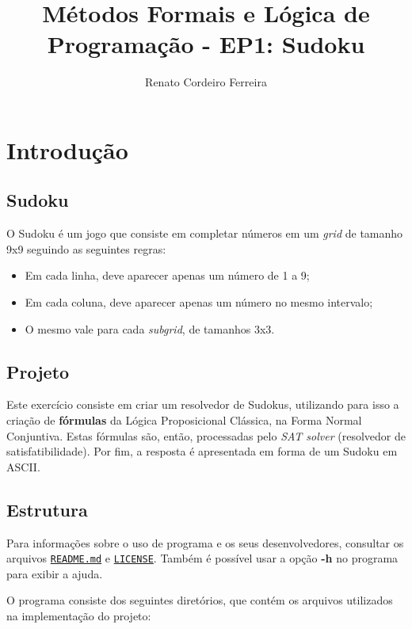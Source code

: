 \documentclass[a4paper]{article}
\title  {Métodos Formais e Lógica de Programação - EP1: Sudoku}
\author {Renato Cordeiro Ferreira}
\date   {}
\begin{document}
\maketitle

\tableofcontents

\newpage %
\section{Introdução}
\label{sec:introducao}

  \subsection{Sudoku}
    O Sudoku é um jogo que consiste em completar números em um \emph{grid} 
    de tamanho 9x9 seguindo as seguintes regras:
    \begin{itemize}
      \item Em cada linha, deve aparecer apenas um número de 1 a 9;
      \item Em cada coluna, deve aparecer apenas um número no mesmo intervalo;
      \item O mesmo vale para cada \emph{subgrid}, de tamanhos 3x3. 
    \end{itemize}
  
  \subsection{Projeto}
    Este exercício consiste em criar um resolvedor de Sudokus, utilizando
    para isso a criação de \textbf{fórmulas} da Lógica Proposicional Clássica,
    na Forma Normal Conjuntiva. Estas fórmulas são, então, processadas pelo
    \emph{SAT solver} (resolvedor de satisfatibilidade). Por fim, a resposta
    é apresentada em forma de um Sudoku em ASCII.
  
  \subsection{Estrutura}
  
    Para informações sobre o uso de programa e os seus desenvolvedores,
    consultar os arquivos \href{run:../README.md}{\texttt{README.md}} e
    \href{run:../LICENSE}{\texttt{LICENSE}}. Também é possível usar a 
    opção \textbf{-h} no programa para exibir a ajuda.
  
    O programa consiste dos seguintes diretórios, que contém os arquivos 
    utilizados na implementação do projeto:
   
\end{document}
